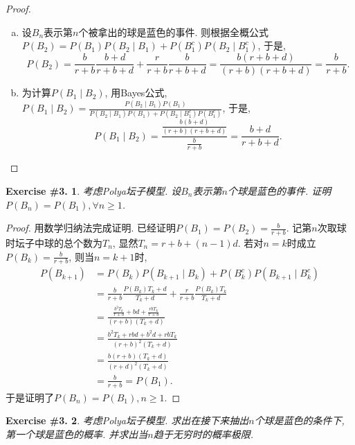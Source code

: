 \documentclass[UTF8, a4paper]{article}
\newtheorem{exercise}{Exercise \#3.}
\begin{document}
\begin{proof}
\begin{enumerate}[a)]
    \item 设\(B_n\)表示第\(n\)个被拿出的球是蓝色的事件. 则根据全概公式\(P(B_2) = P(B_1) P(B_2 \mid B_1) + P(B_1^c) P(B_2 \mid B_1^c) \), 于是, $$P(B_2) = \frac{b}{r+b} \frac{b+d}{r+b +d} + \frac{r}{r+b}\frac{b}{r+b+d} = \frac{b(r+b+d)}{(r+b)(r+b+d)} = \frac{b}{r+b}.$$
    \item 为计算\(P(B_1 \mid B_2)\), 用Bayes公式, \(P(B_1 \mid B_2) = \frac{P(B_2 \mid B_1)P(B_1)}{P(B_2 \mid B_1)P(B_1) + P(B_2 \mid B_1^c)P(B_1^c)}\), 于是, $$
    P(B_1\mid B_2) = \frac{\frac{b(b+d)}{(r+b)(r+b+d)}}{\frac{b}{r+b}} = \frac{b+d}{r+b+d}.
    $$
\end{enumerate}
\end{proof}





\begin{framed}
\begin{exercise}
考虑Polya坛子模型. 设\(B_n\)表示第\(n\)个球是蓝色的事件. 证明\(P(B_n) = P(B_1), \forall n \geq 1\).
\end{exercise}
\end{framed}


\begin{proof}
用数学归纳法完成证明. 已经证明\(P(B_1) = P(B_2) = \frac{b}{r+b}\).
记第\(n\)次取球时坛子中球的总个数为\(T_n\), 显然\(T_n = r+b + (n-1)d\).
若对\(n = k\)时成立\(P(B_k) = \frac{b}{r+b}\), 则当\(n = k+1\)时, 
$$
\begin{aligned}
    P(B_{k+1}) &= P(B_k) P(B_{k+1} \mid B_k) + P(B_k^c) P(B_{k+1} \mid B_k^c) \\
    &= \frac{b}{r+b} \frac{P(B_k) T_k+d}{T_k+d} + \frac{r}{r+b} \frac{P(B_k)T_k}{T_k+d} \\
    & = \frac{\frac{b^2T_k}{r+b} + bd + \frac{rbT_k}{r+b}}{(r+b)(T_k+d)} \\
    &= \frac{b^2 T_k +rbd + b^2d + rbT_k}{(r+b)^2(T_k+d)} \\
    &= \frac{b(r+b)(T_k+d)}{(r+d)^2(T_k +d)} \\ & = \frac{b}{r+b} = P(B_1).
\end{aligned}
$$
于是证明了\(P(B_n) = P(B_1), n\geq 1\).
\end{proof}


\begin{framed}
\begin{exercise}
    考虑Polya坛子模型. 求出在接下来抽出\(n\)个球是蓝色的条件下, 第一个球是蓝色的概率. 并求出当\(n\)趋于无穷时的概率极限.
\end{exercise}
\end{framed}
\end{document}
